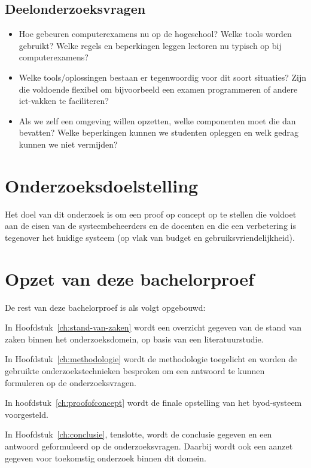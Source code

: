 \subsection{Deelonderzoeksvragen}
\begin{itemize}
	 \item Hoe gebeuren computerexamens nu op de hogeschool? Welke tools worden gebruikt? Welke regels en beperkingen leggen lectoren nu typisch op bij computerexamens?
	
	\item Welke tools/oplossingen bestaan er tegenwoordig voor dit soort situaties? Zijn die voldoende flexibel om bijvoorbeeld een examen programmeren of andere ict-vakken te faciliteren?
	
	\item Als we zelf een omgeving willen opzetten, welke componenten moet die dan bevatten? Welke beperkingen kunnen we studenten opleggen en welk gedrag kunnen we niet vermijden?

\end{itemize} 

\section{Onderzoeksdoelstelling}
\label{sec:onderzoeksdoelstelling}

Het doel van dit onderzoek is om een proof op concept op te stellen die voldoet aan de eisen van de systeembeheerders en de docenten en die een verbetering is tegenover het huidige systeem (op vlak van budget en gebruiksvriendelijkheid). 

\section{Opzet van deze bachelorproef}
\label{sec:opzet-bachelorproef}


De rest van deze bachelorproef is als volgt opgebouwd:

In Hoofdstuk~\ref{ch:stand-van-zaken} wordt een overzicht gegeven van de stand van zaken binnen het onderzoeksdomein, op basis van een literatuurstudie.

In Hoofdstuk~\ref{ch:methodologie} wordt de methodologie toegelicht en worden de gebruikte onderzoekstechnieken besproken om een antwoord te kunnen formuleren op de onderzoeksvragen.

In hoofdstuk~\ref{ch:proofofconcept} wordt de finale opstelling van het byod-systeem voorgesteld.  

In Hoofdstuk~\ref{ch:conclusie}, tenslotte, wordt de conclusie gegeven en een antwoord geformuleerd op de onderzoeksvragen. Daarbij wordt ook een aanzet gegeven voor toekomstig onderzoek binnen dit domein.

